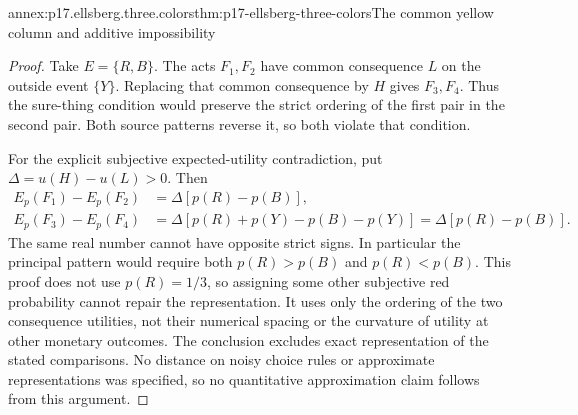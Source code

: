 \begin{annexitem}{annex:p17.ellsberg.three.colors}{thm:p17-ellsberg-three-colors}{The common yellow column and additive impossibility}
\begin{proof}
Take \(E=\{R,B\}\). The acts \(F_1,F_2\) have
common consequence \(L\) on the outside event \(\{Y\}\).
Replacing that common consequence by \(H\) gives
\(F_3,F_4\). Thus the sure-thing condition would
preserve the strict ordering of the first pair in
the second pair. Both source patterns reverse it,
so both violate that condition.

For the explicit subjective expected-utility
contradiction, put \(\Delta=u(H)-u(L)>0\).
Then
\[
\begin{aligned}
 E_p(F_1)-E_p(F_2)&=\Delta[p(R)-p(B)],\\
 E_p(F_3)-E_p(F_4)
       &=\Delta[p(R)+p(Y)-p(B)-p(Y)]
         =\Delta[p(R)-p(B)].
\end{aligned}
\]
The same real number cannot have opposite strict
signs. In particular the principal pattern would
require both \(p(R)>p(B)\) and \(p(R)<p(B)\).
This proof does not use \(p(R)=1/3\), so assigning
some other subjective red probability cannot
repair the representation.
It uses only the ordering of the two consequence
utilities, not their numerical spacing or the
curvature of utility at other monetary outcomes.
The conclusion excludes exact representation of
the stated comparisons. No distance on noisy
choice rules or approximate representations was
specified, so no quantitative approximation
claim follows from this argument.
\end{proof}
\end{annexitem}

